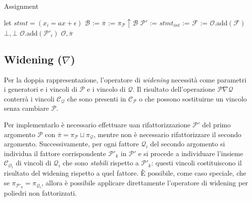 \documentclass{mimosis}
\theoremstyle{definition}
\begin{document}
\begin{algorithm}[H]
\caption{Assignment}\label{assignment}
\begin{algorithmic}[1]
\State let $stmt = (x_{i} = ax + \epsilon) $
\State$\mathcal{B}$ := 
\State$\overline{\pi}$ := $\pi_{\mathcal{P}} \uparrow \mathcal{B}$
\State$\mathcal{P}'$ := 
\State$stmt_{int}$ := 
\State$\mathcal{F}$ := 
\State $\mathcal{O}$.add$(\mathcal{F})$
\State\Return$\bot,\bot$
\EndIf
\Else
\State $\mathcal{O}$.add$(\mathcal{P}'_i)$
\EndIf
\EndFor
\State\Return $\mathcal{O}, \overline{\pi}$
\EndFunction
\end{algorithmic}
\end{algorithm}

\subsection{Widening (\(\nabla\))}
\label{sec:org4901834}
Per la doppia rappresentazione, l'operatore di \emph{widening} necessità come
parametri i generatori e i vincoli di \(\mathcal{P}\) e i vincolo di
\(\mathcal{Q}\). Il risultato dell'operazione \(\mathcal{P} \nabla
\mathcal{Q}\) conterrà i vincoli \(\mathcal{C}_{\mathcal{Q}}\) che sono presenti in
\(\mathcal{C}_{\mathcal{P}}\) o che possono sostituirne un vincolo senza cambiare
\(\mathcal{P}\).

Per implementarlo è necessario effettuare uan rifattorizzazione \(\mathcal{P}'\)
del primo argomento \(\mathcal{P}\) con \(\overline{\pi} = \pi_{\mathcal{P}} \sqcup
\pi_{\mathcal{Q}}\), mentre non è necessario rifattorizzare il secondo argomento.
Successivamente, per ogni fattore \(\mathcal{Q}_i\) del secondo argomento si
individua il fattore corrispondente \(\mathcal{P}'_k\) in \(\mathcal{P}'\) e si
procede a individuare l'insieme \(\mathcal{C}_{\mathcal{O}_i}\) di vincoli di
\(\mathcal{Q}_i\) che sono \emph{stabili} rispetto a \(\mathcal{P}'_k\): questi vincoli
costituiscono il risultato del widening rispetto a quel fattore. È possibile,
come caso speciale, che se \(\pi_{\mathcal{P}'_k} = \pi_{\mathcal{Q}_i}\), allora è
possibile applicare direttamente l'operatore di widening per poliedri non
fattorizzati.
\end{document}
